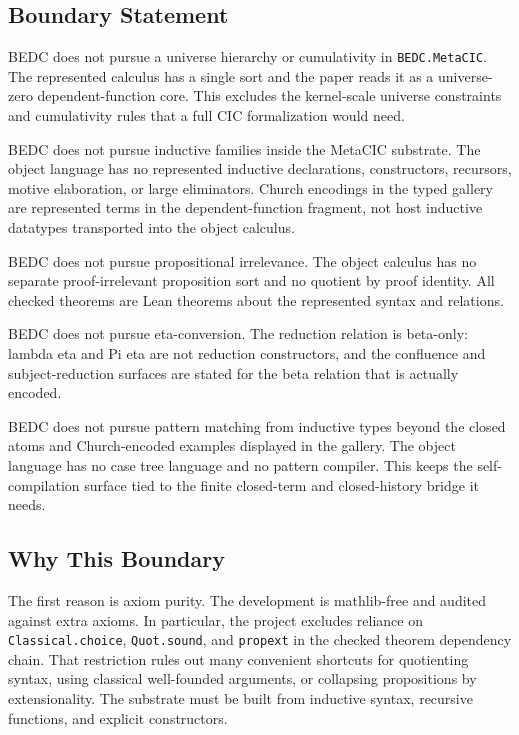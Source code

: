 \subsection{Boundary Statement}
\label{subsec:metatheory-boundary-statement}

BEDC does not pursue a universe hierarchy or cumulativity in
\texttt{BEDC.MetaCIC}.  The represented calculus has a single sort and the
paper reads it as a universe-zero dependent-function core.  This excludes the
kernel-scale universe constraints and cumulativity rules that a full CIC
formalization would need.

BEDC does not pursue inductive families inside the MetaCIC substrate.  The
object language has no represented inductive declarations, constructors,
recursors, motive elaboration, or large eliminators.  Church encodings in the
typed gallery are represented terms in the dependent-function fragment, not
host inductive datatypes transported into the object calculus.

BEDC does not pursue propositional irrelevance.  The object calculus has no
separate proof-irrelevant proposition sort and no quotient by proof identity.
All checked theorems are Lean theorems about the represented syntax and
relations.

BEDC does not pursue eta-conversion.  The reduction relation is beta-only:
lambda eta and Pi eta are not reduction constructors, and the confluence and
subject-reduction surfaces are stated for the beta relation that is actually
encoded.

BEDC does not pursue pattern matching from inductive types beyond the closed
atoms and Church-encoded examples displayed in the gallery.  The object
language has no case tree language and no pattern compiler.  This keeps the
self-compilation surface tied to the finite closed-term and closed-history
bridge it needs.

\subsection{Why This Boundary}
\label{subsec:metatheory-boundary-rationale}

The first reason is axiom purity.  The development is mathlib-free and audited
against extra axioms.  In particular, the project excludes reliance on
\texttt{Classical.choice}, \texttt{Quot.sound}, and \texttt{propext} in the
checked theorem dependency chain.  That restriction rules out many convenient
shortcuts for quotienting syntax, using classical well-founded arguments, or
collapsing propositions by extensionality.  The substrate must be built from
inductive syntax, recursive functions, and explicit constructors.

